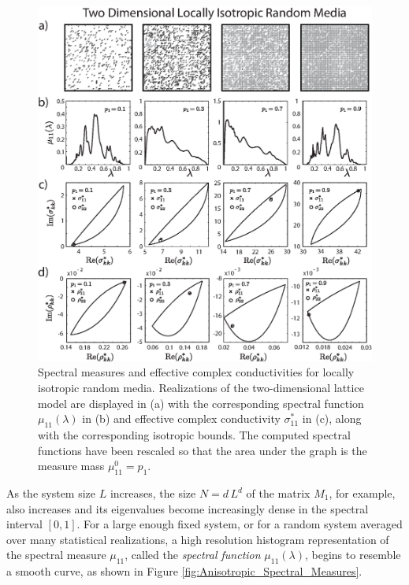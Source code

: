 \documentclass{cmslatex}
\begin{document}
%
\begin{figure}[t]
  \centerline{\includegraphics[scale=0.755]{A_Locally_Isotropic_RRN_11.eps}}
\caption{Spectral measures and effective complex conductivities for
  locally isotropic random media. Realizations of the two-dimensional
  lattice model are displayed in (a) with the 
  corresponding spectral function $\mu_{11}(\lambda)$ in (b) and effective
  complex conductivity $\sigma^*_{11}$ in (c), along with the corresponding
  isotropic bounds. The computed
  spectral functions have been rescaled so that the area under the
  graph is the measure mass $\mu^0_{11}=p_1$. 
        } 
\label{fig:LocIsotropic_RRN_11}
\end{figure}
%


As the system size $L$ increases, the size $N=d\,L^d$ of the matrix
$M_1$, for example, also increases and its eigenvalues become
increasingly dense in the spectral interval $[0,1]$. For a large
enough fixed system, or for a random system averaged over many
statistical realizations, a high resolution histogram representation
of the spectral measure $\mu_{11}$, called the \emph{spectral function}
$\mu_{11}(\lambda)$, begins to resemble a smooth curve, as shown in Figure
\ref{fig:Anisotropic_Spectral_Measures}.
\end{document}
